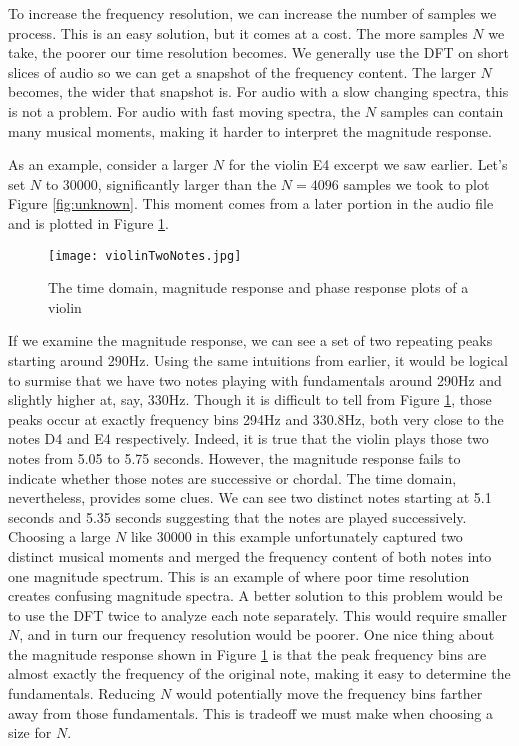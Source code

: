 To increase the frequency resolution, we can increase the number of samples we process.  This is an easy solution,
but it comes at a cost.  The more samples $N$ we take, the poorer our time resolution becomes.  We generally use
the DFT on short slices of audio so we can get a snapshot of the frequency content.  The larger $N$ becomes, the
wider that snapshot is.  For audio with a slow changing spectra, this is not a problem.  For audio with fast moving
spectra, the $N$ samples can contain many musical moments, making it harder to interpret the magnitude response.

As an example, consider a larger $N$ for the violin E4 excerpt we saw earlier.  Let's set $N$ to 30000, significantly larger
than the $N = 4096$ samples we took to plot Figure \ref{fig:unknown}.  This moment comes from a later portion in
the audio file and is plotted in Figure \ref{fig:violinTwoNotes}.

\begin{figure}[h]
	\caption{The time domain, magnitude response and phase response plots of a violin}
	\label{fig:violinTwoNotes}
	\begin{center}
		\texttt{[image: violinTwoNotes.jpg]}
	\end{center}
\end{figure}

If we examine the magnitude response, we can see a set of two repeating peaks starting around 290Hz.  Using the
same intuitions from earlier, it would be logical to surmise that we have two notes playing with fundamentals around
290Hz and slightly higher at, say, 330Hz.  Though it is difficult to tell from Figure \ref{fig:violinTwoNotes}, those peaks
occur at exactly frequency bins 294Hz and 330.8Hz, both very close to the notes D4 and E4 respectively.  Indeed, it is
true that the violin plays those two notes from 5.05 to 5.75 seconds.  However, the magnitude response fails
to indicate whether those notes are successive or chordal.  The time domain, nevertheless, provides some clues.  We 
can see two distinct notes starting at 5.1 seconds and 5.35 seconds suggesting 
that the notes are played successively.  Choosing a large $N$ like 30000 in this example
unfortunately captured two distinct musical moments and merged the frequency content of both notes into one 
magnitude spectrum.  This is an example of where poor time resolution creates confusing magnitude spectra.  A better
solution to this problem would be to use the DFT twice to analyze each note separately.  This would require smaller $N$,
and in turn our frequency resolution would be poorer.  One nice thing about the magnitude response shown in 
Figure \ref{fig:violinTwoNotes} is that the peak frequency bins are almost exactly the frequency of the original note,
making it easy to determine the fundamentals.  Reducing $N$ would potentially move the frequency bins farther away
from those fundamentals.  This is tradeoff we must make when choosing a size for $N$.  


